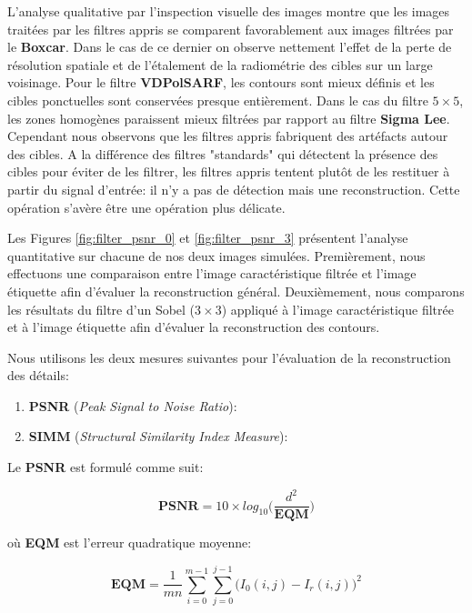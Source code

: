 L'analyse qualitative par l'inspection visuelle des images montre que les images traitées par les filtres appris se comparent favorablement aux images filtrées par le \textbf{Boxcar}. Dans le cas de ce dernier on observe nettement l'effet de la perte de résolution spatiale et de l'étalement de la radiométrie des cibles sur un large voisinage. Pour le filtre \textbf{VDPolSARF}, les contours sont mieux définis et les cibles ponctuelles sont conservées presque entièrement. Dans le cas du filtre $5 \times 5$, les zones homogènes paraissent mieux filtrées par rapport au filtre \textbf{Sigma Lee}. Cependant nous observons que les filtres appris fabriquent des artéfacts autour des cibles.  A la différence des filtres "standards" qui détectent la présence des cibles pour éviter de les filtrer, les filtres appris tentent plutôt de les restituer à partir du signal d'entrée:  il n'y a pas de détection mais une reconstruction. Cette opération s'avère être une opération plus délicate.


Les Figures \ref{fig:filter_psnr_0} et \ref{fig:filter_psnr_3} présentent l'analyse quantitative sur chacune de nos deux images simulées. Premièrement, nous effectuons une comparaison entre l'image caractéristique filtrée et l'image étiquette afin d'évaluer la reconstruction général. Deuxièmement, nous comparons les résultats du filtre d'un Sobel ($3 \times 3$) appliqué à l'image caractéristique filtrée et à l'image étiquette afin d'évaluer la reconstruction des contours.

Nous utilisons les deux mesures suivantes pour l'évaluation de la reconstruction des détails:

\begin{enumerate}
    \item \textbf{PSNR} (\textit{Peak Signal to Noise Ratio}):
    \item \textbf{SIMM} (\textit{Structural Similarity Index Measure}): 
\end{enumerate}

Le \textbf{PSNR} est formulé comme suit:

\begin{equation}
     \textbf{PSNR} = 10 \times log_{10} \bigg( \frac{d^2}{ \textbf{EQM}} \bigg) 
\end{equation}

où \textbf{EQM} est l'erreur quadratique moyenne:

\begin{equation}
    \textbf{EQM} = \frac{1}{mn}\sum_{i=0}^{m-1} \sum_{j=0}^{j-1} \bigg( I_0(i,j) - I_r(i,j) \bigg)^2 
    \label{eq:PSNR}
\end{equation}


